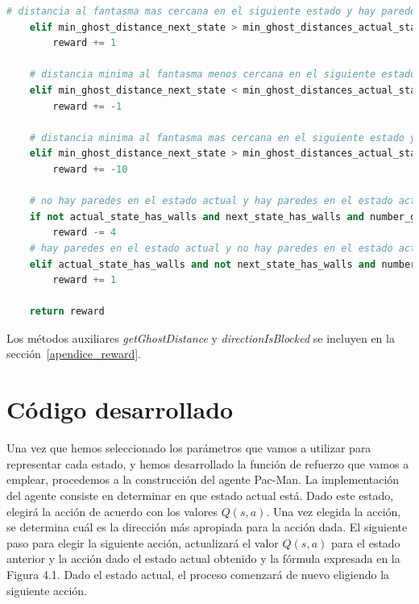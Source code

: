 \documentclass[11pt]{exam}
\begin{document}
\begin{lstlisting}[language=python, basicstyle=\tiny]
	# distancia al fantasma mas cercana en el siguiente estado y hay paredes y no come
	elif min_ghost_distance_next_state > min_ghost_distances_actual_state and actual_state_has_walls and number_ghost_next_state == number_ghost_actual_state:
		reward += 1
	
	# distancia minima al fantasma menos cercana en el siguiente estado y hay paredes y no come
	elif min_ghost_distance_next_state < min_ghost_distances_actual_state and actual_state_has_walls and number_ghost_next_state == number_ghost_actual_state:
		reward += -1
	
	# distancia minima al fantasma mas cercana en el siguiente estado y no hay paredes y no come
	elif min_ghost_distance_next_state > min_ghost_distances_actual_state and not actual_state_has_walls and number_ghost_next_state == number_ghost_actual_state:
		reward += -10
	
	# no hay paredes en el estado actual y hay paredes en el estado actual y no come
	if not actual_state_has_walls and next_state_has_walls and number_ghost_next_state == number_ghost_actual_state:
		reward -= 4
	# hay paredes en el estado actual y no hay paredes en el estado actual y no come
	elif actual_state_has_walls and not next_state_has_walls and number_ghost_next_state == number_ghost_actual_state:
		reward += 1
	
	return reward
\end{lstlisting}

Los métodos auxiliares \textit{getGhostDistance} y \textit{directionIsBlocked} se incluyen en la sección~\ref*{apendice_reward}.


\section{Código desarrollado}\label{codigo}

Una vez que hemos seleccionado los parámetros que vamos a utilizar para representar cada estado, y hemos desarrollado la función de refuerzo que vamos a emplear, procedemos a la construcción del agente Pac-Man. La implementación del agente consiste en determinar en que estado actual está. Dado este estado, elegirá la acción de acuerdo con los valores $Q(s,a)$. Una vez elegida la acción, se determina cuál es la dirección más apropiada para la acción dada. El siguiente paso para elegir la siguiente acción, actualizará el valor $Q(s,a)$ para el estado anterior y la acción dado el estado actual obtenido y la fórmula expresada en la Figura 4.1. Dado el estado actual, el proceso comenzará de nuevo eligiendo la siguiente acción.
\end{document}
